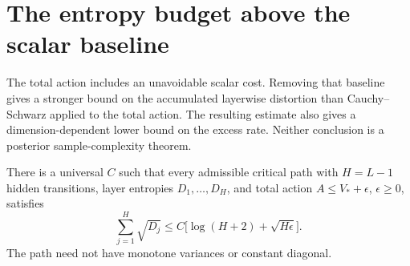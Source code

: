 \section{The entropy budget above the scalar baseline}
\label{sec:critical-sqrt-entropy}

The total action includes an unavoidable scalar cost. Removing that
baseline gives a stronger bound on the accumulated layerwise distortion
than Cauchy--Schwarz applied to the total action. The resulting estimate
also gives a dimension-dependent lower bound on the excess rate.
Neither conclusion is a posterior sample-complexity theorem.

\begin{lemma}
\label{lem:critical-sqrt-entropy-budget}
There is a universal $C$ such that every admissible critical path with
$H=L-1$ hidden transitions, layer entropies $D_1,\ldots,D_H$, and total
action $A\le V_*+\epsilon$, $\epsilon\ge0$, satisfies
\[
 \sum_{j=1}^H\sqrt{D_j}
 \le C\bigl[\log(H+2)+\sqrt{H\epsilon}\bigr].
\]
The path need not have monotone variances or constant diagonal.
\end{lemma}

